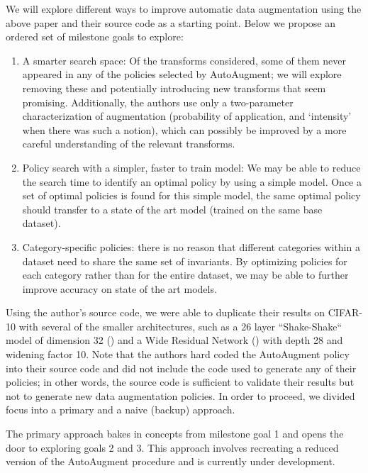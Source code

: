 \documentclass[10pt,twocolumn,letterpaper]{article}
\begin{document}
	We will explore different ways to improve automatic data augmentation using the above paper and their source code as a starting point. Below we propose an ordered set of milestone goals to explore:
	
	\begin{enumerate}

		\item %
			A smarter search space: Of the transforms considered, some of them never appeared in any of the policies selected by AutoAugment; we will explore removing these and potentially introducing new transforms that seem promising. Additionally, the authors use only a two-parameter characterization of augmentation (probability of application, and ‘intensity’ when there was such a notion), which can possibly be improved by a more careful understanding of the relevant transforms.
	
		\item %
			Policy search with a simpler, faster to train model: We may be able to reduce the search time to identify an optimal policy by using a simple model. Once a set of optimal policies is found for this simple model, the same optimal policy should transfer to a state of the art model (trained on the same base dataset).
	
		\item %
			Category-specific policies: there is no reason that different categories within a dataset need to share the same set of invariants. By optimizing policies for each category rather than for the entire dataset, we may be able to further improve accuracy on state of the art models.

	\end{enumerate}

	Using the author's source code, we were able to duplicate their results on CIFAR-10 with several of the smaller architectures, such as a 26 layer ``Shake-Shake`` model of dimension 32 (\cite{Gastaldi2017}) and a Wide Residual Network (\cite{Zagoruyko2016}) with depth 28 and widening factor 10. Note that the authors hard coded the AutoAugment policy into their source code and did not include the code used to generate any of their policies; in other words, the source code is sufficient to validate their results but not to generate new data augmentation policies. In order to proceed, we divided focus into a primary and a naive (backup) approach. 

	The primary approach bakes in concepts from milestone goal 1 and opens the door to exploring goals 2 and 3. This approach involves recreating a reduced version of the AutoAugment procedure and is currently under development.
\end{document}
